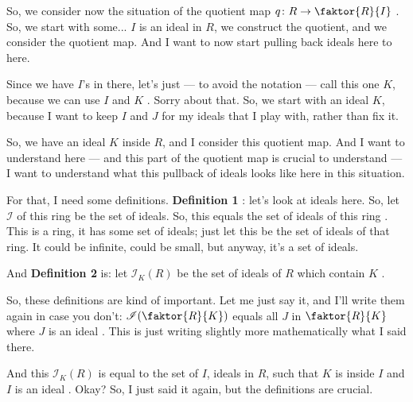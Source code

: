 \begin{speech}[00:16:01 - 00:18:40]
So, we consider now the situation of the quotient map $q \colon R \to \faktor{R}{I}$ . So, we start with some... $I$ is an ideal in $R$, we construct the quotient, and we consider the quotient map. And I want to now start pulling back ideals here to here.

Since we have $I$'s in there, let's just --- to avoid the notation --- call this one $K$, because we can use $I$ and $K$ . Sorry about that. So, we start with an ideal $K$, because I want to keep $I$ and $J$ for my ideals that I play with, rather than fix it.

So, we have an ideal $K$ inside $R$, and I consider this quotient map. And I want to understand here --- and this part of the quotient map is crucial to understand --- I want to understand  what this pullback of ideals looks like here in this situation.

For that, I need some definitions. \textbf{Definition 1} : let's look at ideals here. So, let $\mathscr{I}$ of this ring  be the set of ideals. So, this equals the set of ideals of this ring . This is a ring, it has some set of ideals; just let this be the set of ideals of that ring. It could be infinite, could be small, but anyway, it's a set of ideals.

And \textbf{Definition 2}  is: let $\mathscr{I}_K(R)$  be the set of ideals of $R$ which contain $K$ .

So, these definitions are kind of important. Let me just say it, and I'll write them again in case you don't: $\mathscr{I}(\faktor{R}{K})$ equals all $J$ in $\faktor{R}{K}$ where $J$ is an ideal . This is just writing slightly more mathematically what I said there.

And this $\mathscr{I}_K(R)$ is equal to the set of $I$, ideals in $R$, such that $K$ is inside $I$ and $I$ is an ideal . Okay? So, I just said it again, but the definitions are crucial.
\end{speech}

